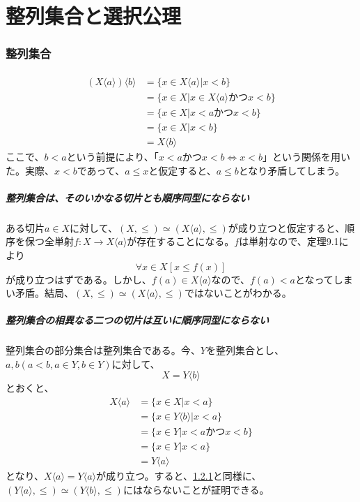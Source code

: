 \documentclass{jsarticle}
\begin{document}
\part{整列集合と選択公理}
\section{整列集合}

\subsection{}
\begin{align*}
(X\langle a\rangle)\langle b\rangle&=\{x\in X\langle a\rangle|x<b\}\\
&=\{x\in X| x\in X\langle a\rangle かつ x<b\}\\
&=\{x\in X| x<aかつx<b\}\\
&=\{x\in X|x<b\}\\
&=X\langle b\rangle
\end{align*}
ここで、$b<a$という前提により、「$x<aかつx<b\Longleftrightarrow x<b$」という関係を用いた。実際、$x<b$であって、$a\leq x$と仮定すると、$a\leq b$となり矛盾してしまう。

\subsection{}
\subsubsection{整列集合は、そのいかなる切片とも順序同型にならない}
\label{9_2}
ある切片$a\in X$に対して、$(X,\leq)\simeq(X\langle a\rangle,\leq)$が成り立つと仮定すると、順序を保つ全単射$f:X\to X\langle a\rangle$が存在することになる。$f$は単射なので、定理9.1により
\[\forall x\in X[x\leq f(x)]\]
が成り立つはずである。しかし、$f(a)\in X\langle a\rangle$なので、$f(a)<a$となってしまい矛盾。結局、$(X,\leq)\simeq(X\langle a\rangle,\leq)$ではないことがわかる。
\subsubsection{整列集合の相異なる二つの切片は互いに順序同型にならない}
整列集合の部分集合は整列集合である。今、$Y$を整列集合とし、$a,b (a<b, a\in Y, b\in Y)$に対して、
\[X= Y\langle b\rangle\]
とおくと、
\begin{align*}
X\langle a\rangle&=\{x\in X|x<a\}\\
&=\{x\in Y\langle b\rangle| x<a\}\\
&=\{x\in Y| x<aかつx<b\}\\
&=\{x\in Y|x<a\}\\
&=Y\langle a\rangle
\end{align*}
となり、$X\langle a\rangle=Y\langle a\rangle$が成り立つ。すると、\ref{9_2}と同様に、$(Y\langle a\rangle,\leq)\simeq(Y\langle b\rangle,\leq)$にはならないことが証明できる。
\end{document}
